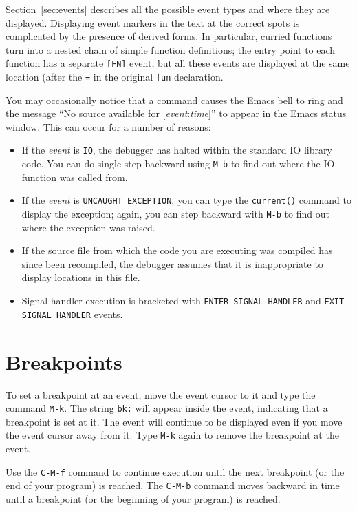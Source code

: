 Section~\ref{sec:events} describes all the possible event types and
where they are displayed.
Displaying event markers in the text at the correct spots
is complicated by the presence of derived forms.
In particular, curried functions turn into a nested chain of simple function
definitions; the entry point to each function has a separate \verb'[FN]' 
event, but all these events are displayed at the same location (after the
\verb'=' in the original \verb'fun' declaration. 

You may occasionally notice that a command causes the Emacs bell to 
ring and the message ``No source available for [{\em event}:{\em time}]''
to appear in the Emacs status window.  This can occur for a number of
reasons:
\begin{itemize}
\item If the {\em event} is \verb'IO', the debugger has halted within
the standard IO library code. You can do single step backward using \verb'M-b'
to find out where the IO function was called from.
\item If the {\em event} is \verb'UNCAUGHT EXCEPTION', you can type the
\verb'current()' command to display the exception; again, you can step
backward with \verb'M-b' to find out where the exception was raised.
\item If the source file from which the code you are executing was compiled
has since been recompiled, the debugger assumes that it is inappropriate
to display locations in this file.
\item Signal handler execution is bracketed with \verb'ENTER SIGNAL HANDLER'
and \verb'EXIT SIGNAL HANDLER' events.
\end{itemize}

\section{Breakpoints}
\label{sec:breakpoints}
To set a breakpoint at an event, move the event cursor to it and type
the command \verb'M-k'.  The string \verb'bk:' will appear inside the event,
indicating that a breakpoint is set at it.  The event will continue to
be displayed even if you move the event cursor away from it.  Type \verb'M-k'
again to remove the breakpoint at the event.

Use the \verb'C-M-f' command to continue execution until the next breakpoint
(or the end of your program) is reached.  The \verb'C-M-b' command moves 
backward in time until a breakpoint (or the beginning of your program) is 
reached.

